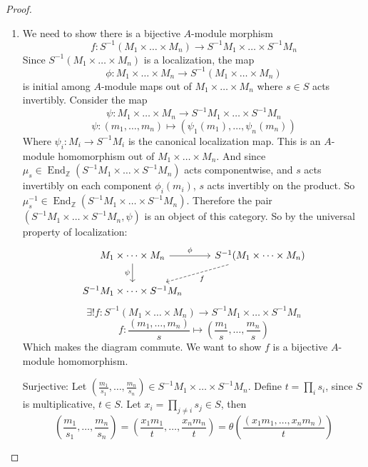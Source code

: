 \documentclass[hidelinks,12pt]{article}
\newcommand{\Z}{\mathbb{Z}}
\newcommand{\End}{\operatorname{End}}
\begin{document}
\begin{proof}
    \begin{enumerate}[label=(\alph*).]
        \item We need to show there is a bijective \(A\)-module morphism
            \[
                f:S^{-1}(M_{1}\times\dots\times M_{n})\to S^{-1}M_{1}\times\dots\times S^{-1}M_{n}
            \]
            Since \(S^{-1}(M_{1}\times\dots\times M_{n})\) is a localization, the map
            \[
                \phi:M_{1}\times\dots\times M_{n}\to S^{-1}(M_{1}\times\dots\times M_{n})
            \]
            is initial among \(A\)-module maps out of \(M_{1}\times\dots\times M_{n}\) where \(s\in S\) acts invertibly. Consider the map \[
                \psi:M_{1}\times\dots\times M_{n}\to S^{-1}M_{1}\times\dots\times S^{-1}M_{n}
            \]
            \[
                \psi:(m_{1},\dots,m_{n})\mapsto\left(\psi_{1}(m_{1}),\dots,\psi_{n}(m_{n})\right)
            \]
            Where \(\psi_{i}:M_{i}\to S^{-1}M_{i}\) is the canonical localization map. This is an \(A\)-module homomorphism out of \(M_{1}\times\dots\times M_{n}\). And since \(\mu_{s}\in\End_{\Z}\left(S^{-1}M_{1}\times\dots\times S^{-1}M_{n}\right)\) acts componentwise, and \(s\) acts invertibly on each component \(\phi_{i}(m_{i})\), \(s\) acts invertibly on the product. So \(\mu_{s}^{-1}\in\End_{\Z}\left(S^{-1}M_{1}\times\dots\times S^{-1}M_{n}\right)\). Therefore the pair \((S^{-1}M_{1}\times\dots\times S^{-1}M_{n},\psi)\) is an object of this category. So by the universal property of localization:
            \[
                \begin{tikzcd}
                    M_{1}\times\dots\times M_{n} \arrow[r, "\phi"] \arrow[d, "\psi"'] & S^{-1}(M_{1}\times\dots\times M_{n}) \arrow[dl, "f",dashed] \\
                    S^{-1}M_{1}\times\dots\times S^{-1}M_{n}  &
                \end{tikzcd}
\]
\[
    \exists !f:S^{-1}(M_{1}\times\dots\times M_{n})\to S^{-1}M_{1}\times\dots\times S^{-1}M_{n}
\]
\[
f:\frac{(m_{1},\dots,m_{n})}{s}\mapsto\left(\frac{m_{1}}{s},\dots,\frac{m_{n}}{s}\right)
\]
Which makes the diagram commute. We want to show \(f\) is a bijective \(A\)-module homomorphism.
\par Surjective: Let \(\left(\frac{m_{1}}{s_{1}},\dots,\frac{m_{n}}{s_{n}}\right)\in S^{-1}M_{1}\times\dots\times S^{-1}M_{n}\). Define \(t=\prod_{i}s_{i}\), since \(S\) is multiplicative, \(t\in S\). Let \(x_{i}=\prod_{j\neq i}s_{j}\in S\), then
\[
    \left(\frac{m_{1}}{s_{1}},\dots,\frac{m_{n}}{s_{n}}\right)=\left(\frac{x_{1}m_{1}}{t},\dots,\frac{x_{n}m_{n}}{t}\right)=\theta\left(\frac{(x_{1}m_{1},\dots,x_{n}m_{n})}{t}\right)
\]
\end{enumerate}
\end{proof}
\end{document}
